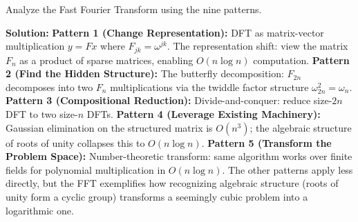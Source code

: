 \begin{exercise}[Intermediate]
Analyze the Fast Fourier Transform using the nine patterns.
\end{exercise}
\textbf{Solution:} \textbf{Pattern 1 (Change Representation):} DFT as matrix-vector multiplication $y = Fx$ where $F_{jk} = \omega^{jk}$. The representation shift: view the matrix $F_n$ as a product of sparse matrices, enabling $O(n \log n)$ computation. \textbf{Pattern 2 (Find the Hidden Structure):} The butterfly decomposition: $F_{2n}$ decomposes into two $F_n$ multiplications via the twiddle factor structure $\omega_{2n}^2 = \omega_n$. \textbf{Pattern 3 (Compositional Reduction):} Divide-and-conquer: reduce size-$2n$ DFT to two size-$n$ DFTs. \textbf{Pattern 4 (Leverage Existing Machinery):} Gaussian elimination on the structured matrix is $O(n^3)$; the algebraic structure of roots of unity collapses this to $O(n \log n)$. \textbf{Pattern 5 (Transform the Problem Space):} Number-theoretic transform: same algorithm works over finite fields for polynomial multiplication in $O(n \log n)$. The other patterns apply less directly, but the FFT exemplifies how recognizing algebraic structure (roots of unity form a cyclic group) transforms a seemingly cubic problem into a logarithmic one.

